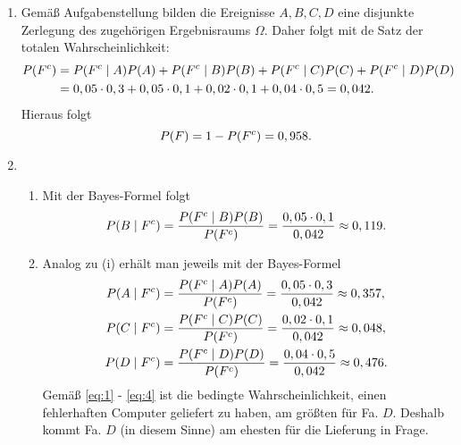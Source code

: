 \documentclass{exercise}
\begin{document}
    \begin{enumerate}
        \item Gemäß Aufgabenstellung bilden die Ereignisse \(A, B, C, D\) eine disjunkte Zerlegung des zugehörigen Ergebnisraums \(\Omega\).
        Daher folgt mit de Satz der totalen Wahrscheinlichkeit:
        \begin{align*}
            P\parentheses*{F^c} &= P\parentheses*{F^c \mid A}P\parentheses*{A} + P\parentheses*{F^c \mid B}P\parentheses*{B} + P\parentheses*{F^c \mid C}P\parentheses*{C} + P\parentheses*{F^c \mid D}P\parentheses*{D}\\
            &= 0,05 \cdot 0,3 + 0,05 \cdot 0,1 + 0,02 \cdot 0,1 + 0,04 \cdot 0,5 = 0,042.
        \end{align*}
        Hieraus folgt
        \[
            P\parentheses*{F} = 1 - P\parentheses*{F^c} = 0,958.
        \]
        \item 
        \begin{enumerate}
            \item Mit der Bayes-Formel folgt
            \begin{equation}\label{eq:1}
                P\parentheses*{B \mid F^c} = \frac{P\parentheses*{F^c \mid B}P\parentheses*{B}}{P\parentheses*{F^c}} = \frac{0,05 \cdot 0,1}{0,042} \approx 0,119.
            \end{equation}
            \item Analog zu (i) erhält man jeweils mit der Bayes-Formel
            \begin{align}
                P\parentheses*{A \mid F^c} &= \frac{P\parentheses*{F^c \mid A}P\parentheses*{A}}{P\parentheses*{F^c}} = \frac{0,05 \cdot 0,3}{0,042} \approx 0,357,\\
                P\parentheses*{C \mid F^c} &= \frac{P\parentheses*{F^c \mid C}P\parentheses*{C}}{P\parentheses*{F^c}} = \frac{0,02 \cdot 0,1}{0,042} \approx 0,048,\\
                P\parentheses*{D \mid F^c} &= \frac{P\parentheses*{F^c \mid D}P\parentheses*{D}}{P\parentheses*{F^c}} = \frac{0,04 \cdot 0,5}{0,042} \approx 0,476.\label{eq:4}
            \end{align}
            Gemäß \eqref{eq:1} - \eqref{eq:4} ist die bedingte Wahrscheinlichkeit, einen fehlerhaften Computer geliefert zu haben, am größten für Fa. \(D\).
            Deshalb kommt Fa. \(D\) (in diesem Sinne) am ehesten für die Lieferung in Frage.
        \end{enumerate}
    \end{enumerate}
\end{document}
